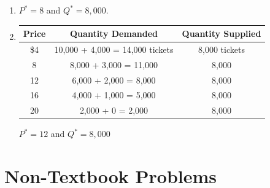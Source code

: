 \documentclass{article}
\begin{document}
\begin{enumerate}
\begin{enumerate}
	\item $P^* = 8$ and $Q^* = 8,000$.
	
	\item \phantom{x}
	
	\begin{center}
	\begin{tabular}{c c c}
	\textbf{Price} & \textbf{Quantity Demanded} & \textbf{Quantity Supplied} \\
	\hline
	\$4 & 10,000 + 4,000  = 14,000 tickets & 8,000 tickets \\
	8 & 8,000 + 3,000  = 11,000 & 8,000 \\
	12 & 6,000  + 2,000 = 8,000 & 8,000 \\
	16 & 4,000 + 1,000 = 5,000 & 8,000 \\
	20 & 2,000 + 0 = 2,000 & 8,000
	\end{tabular}
	\end{center}
	
	$P^* = 12$ and $Q^* = 8,000$
	
	\end{enumerate}

\end{enumerate}

\section*{Non-Textbook Problems}
\end{document}
